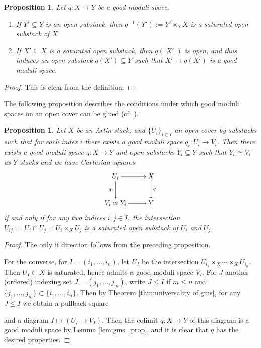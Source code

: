 \documentclass[a4paper,twoside,11pt]{amsart}
\theoremstyle{plain}
\newtheorem{proposition}[theorem]{Proposition}
\theoremstyle{definition}
\theoremstyle{remark}
\numberwithin{equation}{section}
\begin{document}
\begin{proposition}
    Let $q \colon X \to Y$ be a good moduli space. 
    \begin{enumerate}
        \item If $Y' \subseteq Y$ is an open substack, then $q^{-1}(Y') := Y' \times_Y X$ is a saturated open substack of $X$. 
        \item If $X' \subseteq X$ is a saturated open substack, then $q(\lvert X' \rvert)$ is open, and thus induces an open substack $q(X') \subseteq Y$ such that $X'\to q(X')$ is a good moduli space.
    \end{enumerate}
\end{proposition}

\begin{proof}
    This is clear from the definition.
\end{proof}

The following proposition describes the conditions under which good moduli spaces on an open cover can be glued (cf. \cite[Proposition~7.9]{AlperGood}).

\begin{proposition}
    Let $X$ be an Artin stack, and $\lbrace U_i \rbrace_{i \in I}$ an open cover by substacks such that for each index $i$ there exists a good moduli space $q_i \colon U_i \to V_i$. Then there exists a good moduli space $q \colon X \to Y$ and open substacks $Y_i \subseteq Y$ such that $Y_i \simeq V_i$ as $Y$-stacks and we have Cartesian squares
    \begin{align} \label{eqn:loc 3.8}
        \xymatrix{
        U_i \ar[d]_-{q_i} \ar[r] & X \ar[d]^-{q} \\
        V_i\simeq Y_i \ar[r] & Y 
        }
    \end{align}
    if and only if for any two indices $i,j \in I$, the intersection $U_{ij} := U_i \cap U_j = U_i \times_X U_j$ is a saturated open substack of $U_i$ and $U_j$.
\end{proposition}

\begin{proof}
    The only if direction follows from the preceding proposition.

    For the converse, for $I = (i_1,\dots,i_n)$, let $U_I$ be the intersection $U_{i_1} \times_X \cdots \times_X U_{i_n}$. Then $U_I \subset X$ is saturated, hence admits a good moduli space $V_I$. For $J$ another (ordered) indexing set $J = (j_1,\dots,j_m)$, write $J \leq I$ if $m \leq n$ and $\{j_1,\dots,j_m\} \subset \{i_1,\dots,i_n\}$. Then by Theorem \ref{thm:universality of gms}, for any $J \leq I$ we obtain a pullback square
    \begin{center}
    \end{center}
    and a diagram $I \mapsto (U_I \to V_I)$. Then the colimit $q \colon X \to Y$ of this diagram is a good moduli space by Lemma \ref{lem:gms_prop}, and it is clear that $q$ has the desired properties.
\end{proof}
\end{document}
